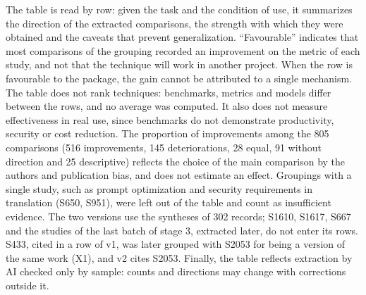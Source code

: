 The table is read by row: given the task and the condition of use, it summarizes the direction of the
extracted comparisons, the strength with which they were obtained and the caveats that prevent
generalization. ``Favourable'' indicates that most comparisons of the grouping recorded an
improvement on the metric of each study, and not that the technique will work in another project.
When the row is favourable to the package, the gain cannot be attributed to a single mechanism. The
table does not rank techniques: benchmarks, metrics and models differ between the rows, and
no average was computed. It also does not measure effectiveness in real use, since benchmarks do not
demonstrate productivity, security or cost reduction. The proportion of improvements among
the 805 comparisons (516 improvements, 145 deteriorations, 28 equal, 91 without direction and 25
descriptive) reflects the choice of the main comparison by the authors and publication
bias, and does not estimate an effect. Groupings with a single study, such as prompt
optimization and security requirements in translation (S650, S951), were left out of the table and
count as insufficient evidence. The two versions use the syntheses of 302 records; S1610, S1617, S667 and the studies of the last
batch of stage 3, extracted later, do not enter its rows. S433, cited in a row of v1, was later grouped
with S2053 for being a version of the same work (X1), and v2 cites S2053. Finally, the table reflects extraction by AI checked only by
sample: counts and directions may change with corrections outside it.
